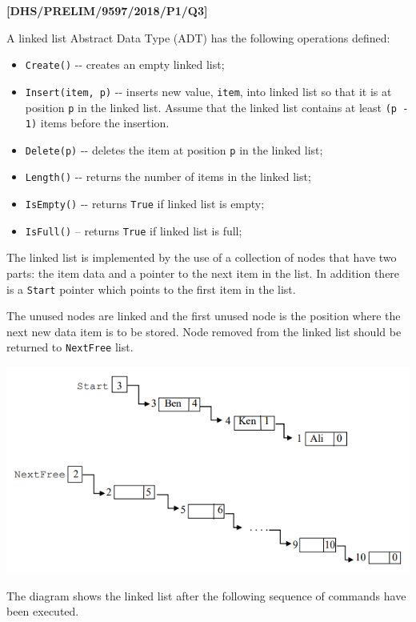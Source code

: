 \item \textbf{{[}DHS/PRELIM/9597/2018/P1/Q3{]} }

A linked list Abstract Data Type (ADT) has the following operations
defined: 
\begin{itemize}
\item \texttt{Create()} -{}- creates an empty linked list; 
\item \texttt{Insert(item, p)} -{}- inserts new value, \texttt{item}, into
linked list so that it is at position \texttt{p} in the linked list.
Assume that the linked list contains at least \texttt{(p - 1)} items
before the insertion. 
\item \texttt{Delete(p)} -{}- deletes the item at position \texttt{p} in
the linked list; 
\item \texttt{Length()} -{}- returns the number of items in the linked list; 
\item \texttt{IsEmpty()} -{}- returns \texttt{True} if linked list is empty; 
\item \texttt{IsFull()} -- returns \texttt{True} if linked list is full; 
\end{itemize}
The linked list is implemented by the use of a collection of nodes
that have two parts: the item data and a pointer to the next item
in the list. In addition there is a \texttt{Start} pointer which points
to the first item in the list. 

The unused nodes are linked and the first unused node is the position
where the next new data item is to be stored. Node removed from the
linked list should be returned to \texttt{NextFree} list.
\begin{center}
\includegraphics[width=0.65\paperwidth]{static/img/9597-HCI-2018-P1-Q3-1}
\par\end{center}

The diagram shows the linked list after the following sequence of
commands have been executed. 

